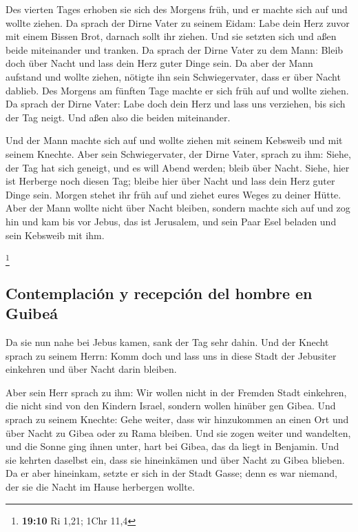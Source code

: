 Des vierten Tages erhoben sie sich des Morgens früh, und
er machte sich auf und wollte ziehen. Da sprach der Dirne Vater zu
seinem Eidam: Labe dein Herz zuvor mit einem Bissen Brot, darnach sollt
ihr ziehen.  Und sie setzten sich und aßen beide
miteinander und tranken. Da sprach der Dirne Vater zu dem Mann: Bleib
doch über Nacht und lass dein Herz guter Dinge sein.  Da
aber der Mann aufstand und wollte ziehen, nötigte ihn sein
Schwiegervater, dass er über Nacht dablieb.  Des Morgens
am fünften Tage machte er sich früh auf und wollte ziehen. Da sprach der
Dirne Vater: Labe doch dein Herz und lass uns verziehen, bis sich der
Tag neigt. Und aßen also die beiden miteinander.

 Und der Mann machte sich auf und wollte ziehen mit seinem
Kebsweib und mit seinem Knechte. Aber sein Schwiegervater, der Dirne
Vater, sprach zu ihm: Siehe, der Tag hat sich geneigt, und es will Abend
werden; bleib über Nacht. Siehe, hier ist Herberge noch diesen Tag;
bleibe hier über Nacht und lass dein Herz guter Dinge sein. Morgen
stehet ihr früh auf und ziehet eures Weges zu deiner Hütte.
 Aber der Mann wollte nicht über Nacht bleiben, sondern
machte sich auf und zog hin und kam bis vor Jebus, das ist Jerusalem,
und sein Paar Esel beladen und sein Kebsweib mit ihm.

\footnote{\textbf{19:10} Ri 1,21; 1Chr 11,4}

\hypertarget{contemplaciuxf3n-y-recepciuxf3n-del-hombre-en-guibeuxe1}{%
\subsection{Contemplación y recepción del hombre en
Guibeá}\label{contemplaciuxf3n-y-recepciuxf3n-del-hombre-en-guibeuxe1}}

 Da sie nun nahe bei Jebus kamen, sank der Tag sehr
dahin. Und der Knecht sprach zu seinem Herrn: Komm doch und lass uns in
diese Stadt der Jebusiter einkehren und über Nacht darin bleiben.

 Aber sein Herr sprach zu ihm: Wir wollen nicht in der
Fremden Stadt einkehren, die nicht sind von den Kindern Israel, sondern
wollen hinüber gen Gibea.  Und sprach zu seinem Knechte:
Gehe weiter, dass wir hinzukommen an einen Ort und über Nacht zu Gibea
oder zu Rama bleiben.  Und sie zogen weiter und
wandelten, und die Sonne ging ihnen unter, hart bei Gibea, das da liegt
in Benjamin.  Und sie kehrten daselbst ein, dass sie
hineinkämen und über Nacht zu Gibea blieben. Da er aber hineinkam,
setzte er sich in der Stadt Gasse; denn es war niemand, der sie die
Nacht im Hause herbergen wollte.

